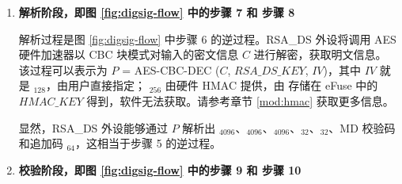 \documentclass[main\_\_CN.tex]{subfiles}
\begin{document}
\begin{enumerate}

    \item {\bfseries 解析阶段，即图 \ref{fig:digsig-flow} 中的步骤 7 和 步骤 8}

        解析过程是图 \ref{fig:digsig-flow} 中步骤 6 的逆过程。RSA\_DS 外设将调用 AES 硬件加速器以 CBC 块模式对输入的密文信息 \begin{math}C\end{math} 进行解密，获取明文信息。
        该过程可以表示为
        \begin{math}P\end{math} = AES-CBC-DEC (\begin{math}C\end{math}, \begin{math}RSA\_DS\_KEY\end{math}, \begin{math}IV\end{math})，其中 \begin{math}IV\end{math} 就是 \begin{math}[IV]_{128}\end{math}，由用户直接指定； \begin{math}[RSA\_DS\_KEY]_{256}\end{math} 由硬件 HMAC 提供，由 存储在 eFuse 中的 \begin{math}HMAC\_KEY\end{math} 得到，软件无法获取。请参考章节 \ref{mod:hmac} \textit{} 获取更多信息。

        显然，RSA\_DS 外设能够通过 \begin{math}P\end{math} 解析出 \begin{math}[Y]_{4096}\end{math}、\begin{math}[M]_{4096}\end{math}、\begin{math}[\overline{r}]_{4096}\end{math}、\begin{math}[M^{\prime}]_{32}\end{math}、\begin{math}[L]_{32}\end{math}、MD 校验码和追加码 \begin{math}[\beta]_{64} \end{math}，这相当于步骤 5 的逆过程。

    \item {\bfseries 校验阶段，即图 \ref{fig:digsig-flow} 中的步骤 9 和 步骤 10}


\end{enumerate}
\end{document}
